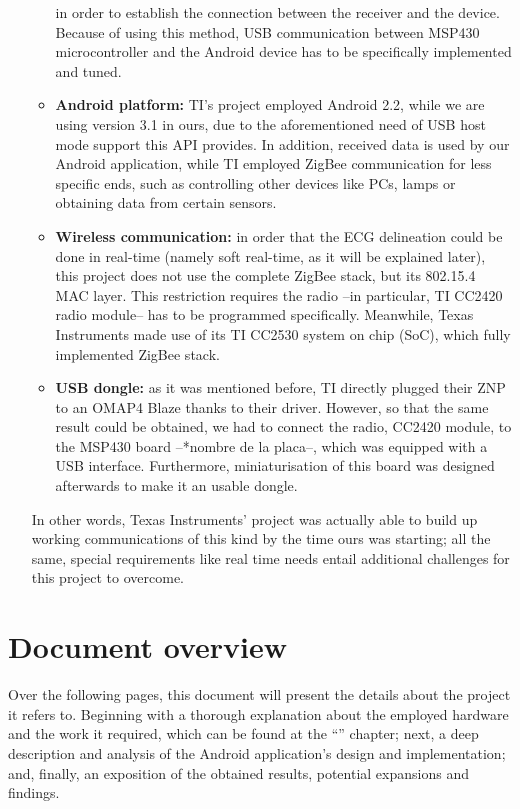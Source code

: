 \begin{itemize}
\begin{itemize}
						in order to establish the connection between the receiver and the device. Because of
						using this method, USB communication between MSP430 microcontroller and the Android
						device has to be specifically implemented and tuned.
					\item \textbf{Android platform:} TI's project employed Android 2.2, while we are using
						version	3.1 in ours, due to the aforementioned need of USB host mode support this API
						provides. In addition, received data is used by our Android application, while TI
						employed ZigBee communication for less specific ends, such as controlling other devices
						like PCs, lamps or obtaining data from certain sensors.
					\item \textbf{Wireless communication:} in order that the ECG delineation could be done in
						real-time (namely soft real-time, as it will be explained later), this project does not
						use the complete ZigBee stack, but its 802.15.4 MAC layer. This restriction requires the
						radio --in particular, TI CC2420 radio module-- has to be programmed specifically.
						Meanwhile, Texas Instruments made use of its TI CC2530 system on chip (SoC), which fully 
						implemented ZigBee stack.
					\item \textbf{USB dongle:} as it was mentioned before, TI directly plugged their ZNP to an
						OMAP4 Blaze thanks to their driver. However, so that the same result could be obtained,
						we had to connect the radio, CC2420 module, to the MSP430 board --*nombre de la placa--,
						which was equipped with a USB interface. Furthermore, miniaturisation of this board was
						designed afterwards to make it an usable dongle.
				\end{itemize}
				In other words, Texas Instruments' project was actually able to build up working communications
				of this kind by the time ours was starting; all the same, special requirements like real time
				needs entail additional challenges for this project to overcome.
		\end{itemize}
	
	\section{Document overview}
		Over the following pages, this document will present the details about the project it refers to.
		Beginning with a thorough explanation about the	employed hardware and the work it required,
		which can be found at the ``'' chapter; next, a deep description and analysis 
		of the Android application's design and implementation; and, finally, an exposition of the obtained 
		results, potential expansions and findings.  

